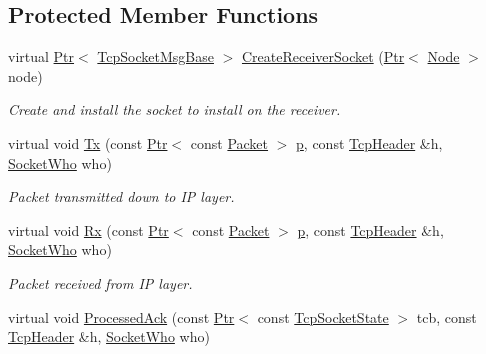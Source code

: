 \subsection*{Protected Member Functions}
\begin{DoxyCompactItemize}
\item 
virtual \hyperlink{classns3_1_1Ptr}{Ptr}$<$ \hyperlink{classns3_1_1TcpSocketMsgBase}{Tcp\+Socket\+Msg\+Base} $>$ \hyperlink{classTcpZeroWindowTest_a50c83ae2a30fae1f9fe9d9409daeea5e}{Create\+Receiver\+Socket} (\hyperlink{classns3_1_1Ptr}{Ptr}$<$ \hyperlink{classns3_1_1Node}{Node} $>$ node)
\begin{DoxyCompactList}\small\item\em Create and install the socket to install on the receiver. \end{DoxyCompactList}\item 
virtual void \hyperlink{classTcpZeroWindowTest_a8ae4bc8d2e49f2678978253d1821201f}{Tx} (const \hyperlink{classns3_1_1Ptr}{Ptr}$<$ const \hyperlink{classns3_1_1Packet}{Packet} $>$ \hyperlink{lte__link__budget__x2__handover__measures_8m_ac9de518908a968428863f829398a4e62}{p}, const \hyperlink{classns3_1_1TcpHeader}{Tcp\+Header} \&h, \hyperlink{classns3_1_1TcpGeneralTest_a29338e6b7137cad650c2ff835713f6ee}{Socket\+Who} who)
\begin{DoxyCompactList}\small\item\em Packet transmitted down to IP layer. \end{DoxyCompactList}\item 
virtual void \hyperlink{classTcpZeroWindowTest_a6cfbd4a866da415fbb1f6e7e55a2fda3}{Rx} (const \hyperlink{classns3_1_1Ptr}{Ptr}$<$ const \hyperlink{classns3_1_1Packet}{Packet} $>$ \hyperlink{lte__link__budget__x2__handover__measures_8m_ac9de518908a968428863f829398a4e62}{p}, const \hyperlink{classns3_1_1TcpHeader}{Tcp\+Header} \&h, \hyperlink{classns3_1_1TcpGeneralTest_a29338e6b7137cad650c2ff835713f6ee}{Socket\+Who} who)
\begin{DoxyCompactList}\small\item\em Packet received from IP layer. \end{DoxyCompactList}\item 
virtual void \hyperlink{classTcpZeroWindowTest_a7a204f4fce57938f52c87d3ea446d2e5}{Processed\+Ack} (const \hyperlink{classns3_1_1Ptr}{Ptr}$<$ const \hyperlink{classns3_1_1TcpSocketState}{Tcp\+Socket\+State} $>$ tcb, const \hyperlink{classns3_1_1TcpHeader}{Tcp\+Header} \&h, \hyperlink{classns3_1_1TcpGeneralTest_a29338e6b7137cad650c2ff835713f6ee}{Socket\+Who} who)

\end{DoxyCompactItemize}
